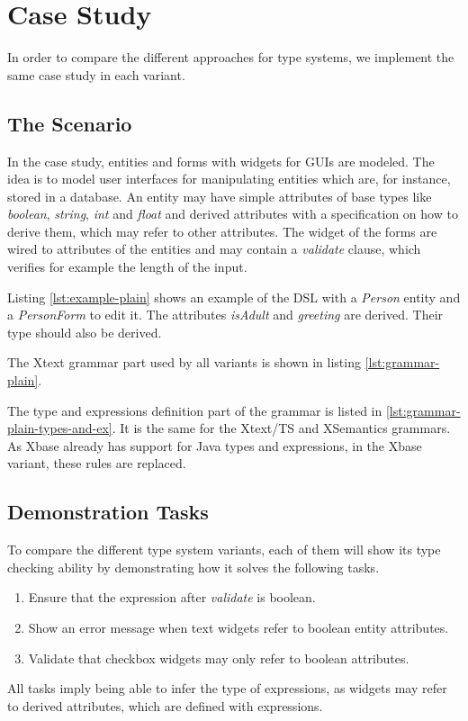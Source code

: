 \section{Case Study}

In order to compare the different approaches for type systems, we implement the same case study in each variant.

\subsection{The Scenario}
In the case study, entities and forms with widgets for GUIs are modeled. The idea is to model user interfaces for manipulating entities which are, for instance, stored in a database. An entity may have simple attributes of base types like \emph{boolean}, \emph{string}, \emph{int} and \emph{float} and derived attributes with a specification on how to derive them, which may refer to other attributes. The widget of the forms are wired to attributes of the entities and may contain a \emph{validate} clause, which verifies for example the length of the input.

Listing \ref{lst:example-plain} shows an example of the DSL with a \emph{Person} entity and a \emph{PersonForm} to edit it. The attributes \emph{isAdult} and \emph{greeting} are derived. Their type should also be derived.



The Xtext grammar part used by all variants is shown in listing \ref{lst:grammar-plain}. 



The type and expressions definition part of the grammar is listed in \ref{lst:grammar-plain-types-and-ex}. It is the same for the Xtext/TS and XSemantics grammars. As Xbase already has support for Java types and expressions, in the Xbase variant, these rules are replaced.



\subsection{Demonstration Tasks}
To compare the different type system variants, each of them will show its type checking ability by demonstrating how it solves the following tasks. 
\begin{enumerate}
\item Ensure that the expression after \emph{validate} is boolean.
\item Show an error message when text widgets refer to boolean entity attributes.
\item Validate that checkbox widgets may only refer to boolean attributes.
\end{enumerate}
All tasks imply being able to infer the type of expressions, as widgets may refer to derived attributes, which are defined with expressions.
